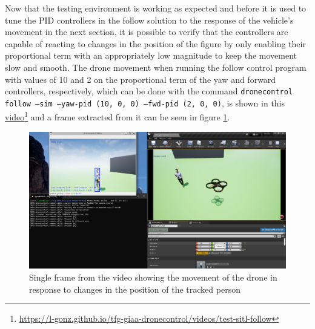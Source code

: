 Now that the testing environment is working as expected and before it is used to tune the PID controllers in the follow solution to the response of the vehicle's movement in the next section, it is possible to verify that the controllers are capable of reacting to changes in the position of the figure by only enabling their proportional term with an appropriately low magnitude to keep the movement slow and smooth.
The drone movement when running the follow control program with values of 10 and 2 on the proportional term of the yaw and forward controllers, respectively, which can be done with the command \texttt{dronecontrol follow --sim --yaw-pid (10, 0, 0) --fwd-pid (2, 0, 0)}, is shown in this \href{https://l-gonz.github.io/tfg-giaa-dronecontrol/videos/test-sitl-follow}{video}\footnote{\url{https://l-gonz.github.io/tfg-giaa-dronecontrol/videos/test-sitl-follow}} and a frame extracted from it can be seen in figure \ref{fig:airsim-test-follow}.

\begin{figure}
  \centering
  \includegraphics[width=\textwidth, keepaspectratio]{img/video-follow-sitl.png}
  \caption{Single frame from the video showing the movement of the drone in response to changes in the position of the tracked person}
  \label{fig:airsim-test-follow}
\end{figure}